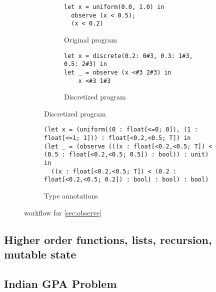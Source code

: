 \documentclass[acmsmall,screen,dvipsnames,x11names,nonacm,anonymous,review]{acmart}
\newcommand{\Slice}{\text{\scshape Slice}\xspace}
\begin{document}
\begin{figure}[ht]
\centering
\begin{subfigure}[t]{0.48\textwidth}  %
  \centering
  \begin{subfigure}[t]{\textwidth}
    \begin{lstlisting}
let x = uniform(0.0, 1.0) in
  observe (x < 0.5);
  (x < 0.2) 
    \end{lstlisting}
    \caption{Original program}
    \label{fig:subA}
  \end{subfigure}

  \vspace{2em} %

  \begin{subfigure}[t]{\textwidth}
    \begin{lstlisting}
let x = discrete(0.2: 0#3, 0.3: 1#3, 0.5: 2#3) in
let _ = observe (x <#3 2#3) in
    x <#3 1#3
    \end{lstlisting}
    \caption{Discretized program}
    \label{fig:subC}
  \end{subfigure}
\end{subfigure}
\hfill
\begin{subfigure}[t]{0.48\textwidth}
\begin{lstlisting}
(let x = (uniform((0 : float[<=0; 0]), (1 : float[<=1; 1])) : float[<0.2,<0.5; T]) in
(let _ = (observe (((x : float[<0.2,<0.5; T]) < (0.5 : float[<0.2,<0.5; 0.5]) : bool)) : unit) in
  ((x : float[<0.2,<0.5; T]) < (0.2 : float[<0.2,<0.5; 0.2]) : bool) : bool) : bool)
\end{lstlisting}
  \caption{Type annotations}
  \label{fig:subB}
\end{subfigure}

\caption{\Slice workflow for \ref{sec:observe}}
\label{fig:main}
\end{figure}


\subsection{Higher order functions, lists, recursion, mutable state}\label{sec:unsupported-constructs}









\subsection{Indian GPA Problem}\label{sec:gpa}
\end{document}
